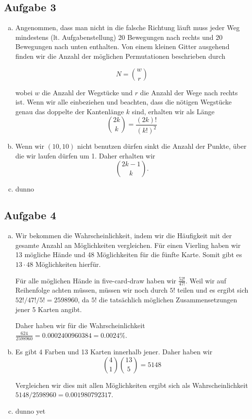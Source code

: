 \subsection*{Aufgabe 3}
\begin{enumerate}[a)]
\item Angenommen, dass man nicht in die falsche Richtung läuft muss jeder Weg mindestens (lt. Aufgabenstellung) 20 Bewegungen nach rechts und 20 Bewegungen nach unten enthalten. Von einem kleinen Gitter ausgehend finden wir die Anzahl der möglichen Permutationen beschrieben durch

\[  N = \binom{w}{r}  \]

wobei $w$ die Anzahl der Wegstücke und $r$ die Anzahl der Wege nach rechts ist. Wenn wir alle einbeziehen und beachten, dass die nötigen Wegstücke genau das doppelte der Kantenlänge $k$ sind, erhalten wir als Länge \[ \binom{2k}{k} = \frac{(2k)!}{(k!)^2} \]

\item Wenn wir $(10,10)$ nicht benutzen dürfen sinkt die Anzahl der Punkte, über die wir laufen dürfen um 1. Daher erhalten wir \[ \binom{2k-1}{k}. \]


\item dunno
\end{enumerate}



\subsection*{Aufgabe 4}
\begin{enumerate}[a)]
  \item Wir bekommen die Wahrscheinlichkeit, indem wir die Häufigkeit mit der gesamte Anzahl an Möglichkeiten vergleichen. Für einen Vierling haben wir 13 mögliche Hände und 48 Möglichkeiten für die fünfte Karte. Somit gibt es $13 \cdot 48$ Möglichkeiten hierfür.

  Für alle möglichen Hände in five-card-draw haben wir $\frac{52!}{47!}$. Weil wir auf Reihenfolge achten müssen, müssen wir noch durch $5!$ teilen und es ergibt sich $52! / 47! / 5! = 2 598 960$, da $5!$ die tatsächlich möglichen Zusammensetzungen jener 5 Karten angibt.

  Daher haben wir für die Wahrscheinlichkeit $\frac{624}{2 598 960} = 0.0002400960384 = 0.0024 \%$.

  \item Es gibt 4 Farben und 13 Karten innerhalb jener. Daher haben wir \[ \binom{4}{1} \binom{13}{5} = 5148 \]

  Vergleichen wir dies mit allen Möglichkeiten ergibt sich als Wahrscheinlichkeit $5 148 / 2598960=0.001980792317$.

  \item dunno yet

\end{enumerate}

